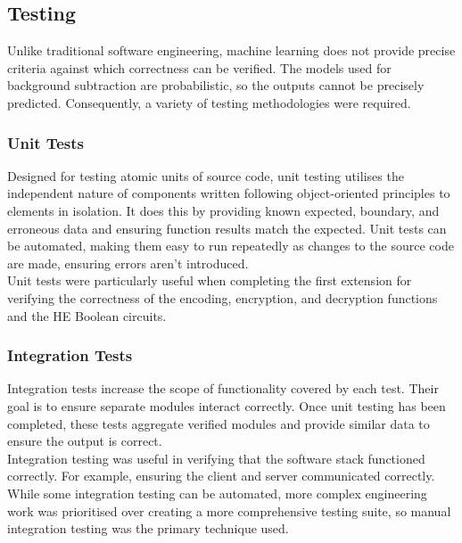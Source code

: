 \setlength{\leftskip}{0cm}

\subsection{Testing}
\label{sec:testing}
\setlength{\leftskip}{0.5cm}
\indent \indent
Unlike traditional software engineering, machine learning does not provide precise criteria against which correctness can be verified. The models used for background subtraction are probabilistic, so the outputs cannot be precisely predicted.  Consequently, a variety of testing methodologies were required.

\setlength{\leftskip}{0cm}
\subsubsection{Unit Tests}
\setlength{\leftskip}{0.5cm}
\indent \indent
Designed for testing atomic units of source code, unit testing utilises the independent nature of components written following object-oriented principles to elements in isolation. It does this by providing known expected, boundary, and erroneous data and ensuring function results match the expected. Unit tests can be automated, making them easy to run repeatedly as changes to the source code are made, ensuring errors aren't introduced.
\smallskip \\ \indent
Unit tests were particularly useful when completing the first extension for verifying the correctness of the encoding, encryption, and decryption functions and the HE Boolean circuits.

\setlength{\leftskip}{0cm}
\subsubsection{Integration Tests}
\setlength{\leftskip}{0.5cm}
\indent \indent
Integration tests increase the scope of functionality covered by each test. Their goal is to ensure separate modules interact correctly. Once unit testing has been completed, these tests aggregate verified modules and provide similar data to ensure the output is correct.
\smallskip \\ \indent
Integration testing was useful in verifying that the software stack functioned correctly. For example, ensuring the client and server communicated correctly. While some integration testing can be automated, more complex engineering work was prioritised over creating a more comprehensive testing suite, so manual integration testing was the primary technique used.

